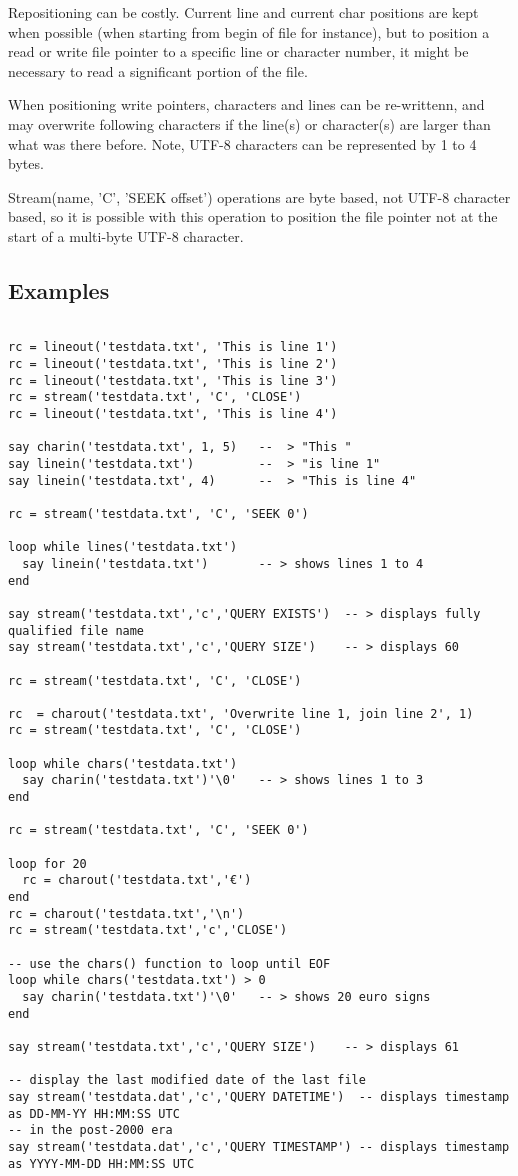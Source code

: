 Repositioning can be costly. Current line and current char positions are kept when
possible (when starting from begin of file for instance),
 but to position a read or write file pointer to a specific line or character
number, it might be necessary to read a significant portion of the file.

When positioning write pointers, characters and lines can be
re-writtenn, and may overwrite following characters if the line(s) or
character(s) are larger than what was there before. Note, UTF-8 characters can be represented by 1 to 4 bytes.

Stream(name, 'C', 'SEEK offset') operations are byte based, not UTF-8 character based, so it is possible
with this operation to position the file pointer not at the start of a multi-byte UTF-8 character.


\subsection{Examples}
\begin{lstlisting}[label=datessexample,caption=Example of using Date()]

rc = lineout('testdata.txt', 'This is line 1')
rc = lineout('testdata.txt', 'This is line 2')
rc = lineout('testdata.txt', 'This is line 3')
rc = stream('testdata.txt', 'C', 'CLOSE')
rc = lineout('testdata.txt', 'This is line 4')

say charin('testdata.txt', 1, 5)   --  > "This "
say linein('testdata.txt')         --  > "is line 1"
say linein('testdata.txt', 4)      --  > "This is line 4"

rc = stream('testdata.txt', 'C', 'SEEK 0')

loop while lines('testdata.txt')
  say linein('testdata.txt')       -- > shows lines 1 to 4
end

say stream('testdata.txt','c','QUERY EXISTS')  -- > displays fully qualified file name
say stream('testdata.txt','c','QUERY SIZE')    -- > displays 60

rc = stream('testdata.txt', 'C', 'CLOSE')

rc  = charout('testdata.txt', 'Overwrite line 1, join line 2', 1)
rc = stream('testdata.txt', 'C', 'CLOSE')

loop while chars('testdata.txt')
  say charin('testdata.txt')'\0'   -- > shows lines 1 to 3
end

rc = stream('testdata.txt', 'C', 'SEEK 0')

loop for 20
  rc = charout('testdata.txt','€')
end
rc = charout('testdata.txt','\n')
rc = stream('testdata.txt','c','CLOSE')

-- use the chars() function to loop until EOF
loop while chars('testdata.txt') > 0
  say charin('testdata.txt')'\0'   -- > shows 20 euro signs
end

say stream('testdata.txt','c','QUERY SIZE')    -- > displays 61

-- display the last modified date of the last file
say stream('testdata.dat','c','QUERY DATETIME')  -- displays timestamp as DD-MM-YY HH:MM:SS UTC
-- in the post-2000 era
say stream('testdata.dat','c','QUERY TIMESTAMP') -- displays timestamp as YYYY-MM-DD HH:MM:SS UTC

\end{lstlisting}
